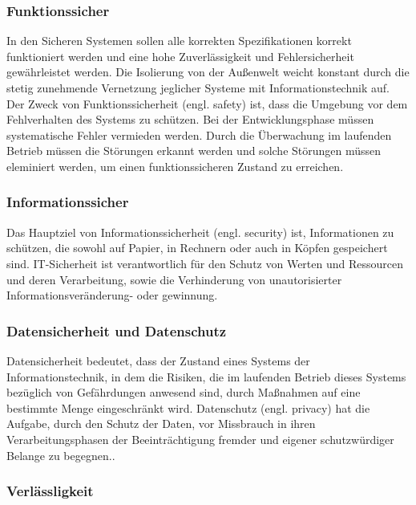 \subsubsection{Funktionssicher}

In den Sicheren Systemen sollen alle korrekten Spezifikationen korrekt funktioniert werden und eine hohe Zuverlässigkeit und Fehlersicherheit gewährleistet werden. Die Isolierung von der Außenwelt weicht konstant durch die stetig zunehmende Vernetzung jeglicher Systeme mit Informationstechnik auf. Der Zweck von Funktionssicherheit (engl. safety) ist, dass die Umgebung vor dem Fehlverhalten des Systems zu schützen.  Bei der Entwicklungsphase müssen systematische Fehler vermieden werden. Durch die Überwachung im laufenden Betrieb müssen die Störungen erkannt werden und solche Störungen müssen eleminiert werden, um einen funktionssicheren Zustand zu erreichen\cite{hoepner2014trends}.

\subsubsection{Informationssicher}

Das Hauptziel von Informationssicherheit (engl. security) ist, Informationen zu schützen, die sowohl auf Papier, in Rechnern oder auch in Köpfen gespeichert sind. IT-Sicherheit ist verantwortlich für den Schutz von Werten und Ressourcen und deren Verarbeitung\cite[81]{int11sicher}, sowie die Verhinderung von unautorisierter Informationsveränderung- oder gewinnung\cite[26]{eckert2013sicherheit}.

\subsubsection{Datensicherheit und Datenschutz}

Datensicherheit bedeutet, dass der Zustand eines Systems der Informationstechnik, in dem die Risiken, die im laufenden Betrieb dieses Systems bezüglich von Gefährdungen anwesend sind, durch Maßnahmen auf eine bestimmte Menge eingeschränkt wird. Datenschutz (engl. privacy) hat die Aufgabe, durch den Schutz der Daten, vor Missbrauch in ihren Verarbeitungsphasen der Beeinträchtigung fremder und eigener schutzwürdiger Belange zu begegnen.\cite[14--15]{eberspacher1994sichere}.

\subsubsection{Verlässligkeit}

